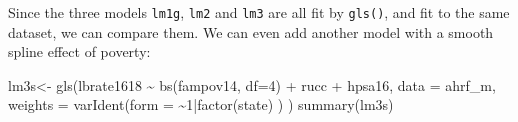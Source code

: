 \documentclass[
  letterpaper,
  DIV=11,
  numbers=noendperiod]{scrreprt}
\newenvironment{Shaded}{\begin{snugshade}}{\end{snugshade}}
\newcommand{\AttributeTok}[1]{\textcolor[rgb]{0.40,0.45,0.13}{#1}}
\newcommand{\DecValTok}[1]{\textcolor[rgb]{0.68,0.00,0.00}{#1}}
\newcommand{\FunctionTok}[1]{\textcolor[rgb]{0.28,0.35,0.67}{#1}}
\newcommand{\NormalTok}[1]{\textcolor[rgb]{0.00,0.23,0.31}{#1}}
\newcommand{\OtherTok}[1]{\textcolor[rgb]{0.00,0.23,0.31}{#1}}
\newcommand{\SpecialCharTok}[1]{\textcolor[rgb]{0.37,0.37,0.37}{#1}}
\begin{document}
Since the three models \texttt{lm1g}, \texttt{lm2} and \texttt{lm3} are
all fit by \texttt{gls()}, and fit to the same dataset, we can compare
them. We can even add another model with a smooth spline effect of
poverty:

\begin{Shaded}
\begin{Highlighting}[]
\NormalTok{lm3s}\OtherTok{\textless{}{-}} \FunctionTok{gls}\NormalTok{(lbrate1618 }\SpecialCharTok{\textasciitilde{}}  \FunctionTok{bs}\NormalTok{(fampov14, }\AttributeTok{df=}\DecValTok{4}\NormalTok{) }\SpecialCharTok{+}\NormalTok{ rucc }\SpecialCharTok{+}\NormalTok{ hpsa16,}
          \AttributeTok{data =}\NormalTok{ ahrf\_m, }
          \AttributeTok{weights =} \FunctionTok{varIdent}\NormalTok{(}\AttributeTok{form =} \SpecialCharTok{\textasciitilde{}}\DecValTok{1}\SpecialCharTok{|}\FunctionTok{factor}\NormalTok{(state) ) )}
\FunctionTok{summary}\NormalTok{(lm3s)}
\end{Highlighting}
\end{Shaded}
\end{document}
